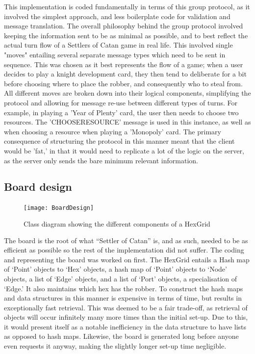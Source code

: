 \documentclass[a4paper,doc,draftfirst]{apa6}
\begin{document}
This implementation is coded fundamentally in terms of this group protocol, as it involved the simplest approach, and less boilerplate code for validation and message translation. The overall philosophy behind the group protocol involved keeping the information sent to be as minimal as possible, and to best reflect the actual turn flow of a Settlers of Catan game in real life. This involved single "moves" entailing several separate message types which need to be sent in sequence. This was chosen as it best represents the flow of a game; when a user decides to play a knight development card, they then tend to deliberate for a bit before choosing where to place the robber, and consequently who to steal from. All different moves are broken down into their logical components, simplifying the protocol and allowing for message re-use between different types of turns. For example, in playing a 'Year of Plenty' card, the user then needs to choose two resources. The 'CHOOSERESOURCE' message is used in this instance, as well as when choosing a resource when playing a 'Monopoly' card. The primary consequence of structuring the protocol in this manner meant that the client would be 'fat,' in that it would need to replicate a lot of the logic on the server, as the server only sends the bare minimum relevant information.  

\subsection{Board design}
\begin{figure}[hbtp]
      \texttt{[image: BoardDesign]}
      \caption{Class diagram showing the different components of a HexGrid}
\end{figure}
The board is the root of what “Settler of Catan” is, and as such, needed to be as efficient as possible so the rest of the implementation did not suffer. The coding and representing the board was worked on first. The HexGrid entails a Hash map of ‘Point’ objects to ‘Hex’ objects, a hash map of ‘Point’ objects to ‘Node’ objects, a list of ‘Edge’ objects, and a list of ‘Port’ objects, a specialisation of ‘Edge.’ It also maintains which hex has the robber. To construct the hash maps and data structures in this manner is expensive in terms of time, but results in exceptionally fast retrieval. This was deemed to be a fair trade-off, as retrieval of objects will occur infinitely many more times than the initial set-up. Due to this, it would present itself as a notable inefficiency in the data structure to have lists as opposed to hash maps. Likewise, the board is generated long before anyone even requests it anyway, making the slightly longer set-up time negligible.
\end{document}
